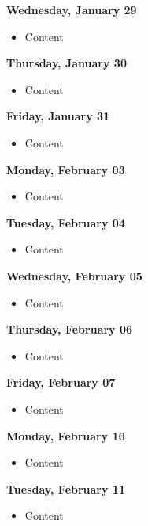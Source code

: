 \documentclass{article}
\begin{document}
\textbf{Wednesday, January 29}

\begin{itemize}
\item Content
\end{itemize}

\textbf{Thursday, January 30}

\begin{itemize}
\item Content
\end{itemize}

\textbf{Friday, January 31}

\begin{itemize}
\item Content
\end{itemize}

\textbf{Monday, February 03}

\begin{itemize}
\item Content
\end{itemize}

\textbf{Tuesday, February 04}

\begin{itemize}
\item Content
\end{itemize}

\textbf{Wednesday, February 05}

\begin{itemize}
\item Content
\end{itemize}

\textbf{Thursday, February 06}

\begin{itemize}
\item Content
\end{itemize}

\textbf{Friday, February 07}

\begin{itemize}
\item Content
\end{itemize}

\textbf{Monday, February 10}

\begin{itemize}
\item Content
\end{itemize}

\textbf{Tuesday, February 11}

\begin{itemize}
\item Content
\end{itemize}
\end{document}

